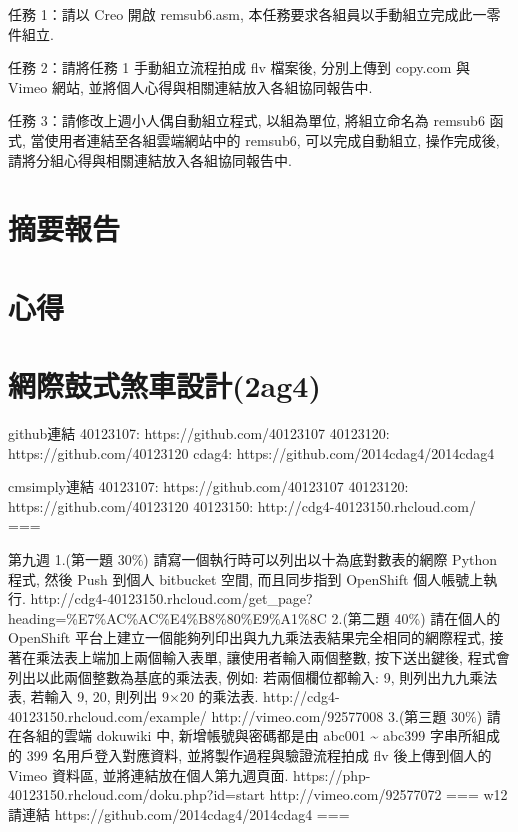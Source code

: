 \documentclass[]{article}
\begin{document}
任務 1：請以 Creo 開啟 remsub6.asm,
本任務要求各組員以手動組立完成此一零件組立.

任務 2：請將任務 1 手動組立流程拍成 flv 檔案後, 分別上傳到 copy.com 與
Vimeo 網站, 並將個人心得與相關連結放入各組協同報告中.

任務 3：請修改上週小人偶自動組立程式, 以組為單位, 將組立命名為 remsub6
函式, 當使用者連結至各組雲端網站中的 remsub6, 可以完成自動組立,
操作完成後, 請將分組心得與相關連結放入各組協同報告中.

\section{摘要報告}\label{ux6458ux8981ux5831ux544a-2}

\section{心得}\label{ux5fc3ux5f97-1}

\section{網際鼓式煞車設計(2ag4)}\label{ux7db2ux969bux9f13ux5f0fux715eux8ecaux8a2dux8a082ag4}

github連結 40123107: https://github.com/40123107 40123120:
https://github.com/40123120 cdag4:
https://github.com/2014cdag4/2014cdag4

cmsimply連結 40123107: https://github.com/40123107 40123120:
https://github.com/40123120 40123150: http://cdg4-40123150.rhcloud.com/
===

第九週 1.(第一題 30\%) 請寫一個執行時可以列出以十為底對數表的網際 Python
程式, 然後 Push 到個人 bitbucket 空間, 而且同步指到 OpenShift
個人帳號上執行.
http://cdg4-40123150.rhcloud.com/get\_page?heading=\%E7\%AC\%AC\%E4\%B8\%80\%E9\%A1\%8C
2.(第二題 40\%) 請在個人的 OpenShift
平台上建立一個能夠列印出與九九乘法表結果完全相同的網際程式,
接著在乘法表上端加上兩個輸入表單, 讓使用者輸入兩個整數, 按下送出鍵後,
程式會列出以此兩個整數為基底的乘法表, 例如: 若兩個欄位都輸入: 9,
則列出九九乘法表, 若輸入 9, 20, 則列出 9×20 的乘法表.
http://cdg4-40123150.rhcloud.com/example/ http://vimeo.com/92577008
3.(第三題 30\%) 請在各組的雲端 dokuwiki 中, 新增帳號與密碼都是由 abc001
\textasciitilde{} abc399 字串所組成的 399 名用戶登入對應資料,
並將製作過程與驗證流程拍成 flv 後上傳到個人的 Vimeo 資料區,
並將連結放在個人第九週頁面.
https://php-40123150.rhcloud.com/doku.php?id=start
http://vimeo.com/92577072 === w12 請連結
https://github.com/2014cdag4/2014cdag4 ===
\end{document}
